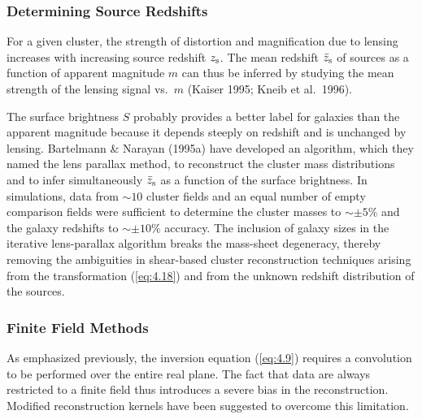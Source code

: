 \documentclass[a4paper,10pt]{article} %
\begin{document}
\subsubsection{Determining Source Redshifts}
\label{NB:subsubsect4.2.4}

For a given cluster, the strength of distortion and magnification due
to lensing increases with increasing source redshift $z_{\rm s}$. The
mean redshift $\bar z_{\rm s}$ of sources as a function of apparent
magnitude $m$ can thus be inferred by studying the mean strength of
the lensing signal vs.\ $m$ (Kaiser 1995; Kneib et al.\ 1996).

The surface brightness $S$ probably provides a better label for
galaxies than the apparent magnitude because it depends steeply on
redshift and is unchanged by lensing. Bartelmann \& Narayan (1995a)
have developed an algorithm, which they named the lens parallax
method, to reconstruct the cluster mass distributions and to infer
simultaneously $\bar z_{\rm s}$ as a function of the surface
brightness. In simulations, data from $\sim10$ cluster fields and an
equal number of empty comparison fields were sufficient to determine
the cluster masses to $\sim\pm5\%$ and the galaxy redshifts to
$\sim\pm10\%$ accuracy. The inclusion of galaxy sizes in the iterative
lens-parallax algorithm breaks the mass-sheet degeneracy, thereby
removing the ambiguities in shear-based cluster reconstruction
techniques arising from the transformation (\ref{eq:4.18}) and from
the unknown redshift distribution of the sources.

\subsubsection{Finite Field Methods}
\label{NB:subsubsect4.2.5}

As emphasized previously, the inversion equation (\ref{eq:4.9})
requires a convolution to be performed over the entire real plane. The
fact that data are always restricted to a finite field thus introduces
a severe bias in the reconstruction. Modified reconstruction kernels
have been suggested to overcome this limitation.
\end{document}
